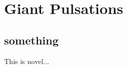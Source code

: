 
\chapter{Giant Pulsations}
\label{giant_pulations_chapter}

\section{something}

This is novel...



